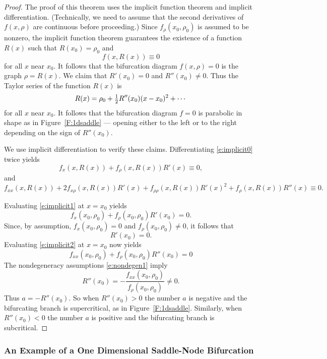 \documentclass{ximera}
\begin{document}
\begin{proof}  The proof of this theorem uses the implicit function theorem and
implicit differentiation.  (Technically, we need to assume that the second
derivatives of $f(x,\rho)$ are continuous before proceeding.) Since 
$f_\rho(x_0,\rho_0)$ is assumed to be nonzero, the implicit function theorem 
guarantees the existence of a function $R(x)$ such that $R(x_0)=\rho_0$ and
\begin{equation}  \label{e:implicit0}
f(x,R(x))\equiv 0
\end{equation}
for all $x$ near $x_0$.  It follows that the bifurcation diagram $f(x,\rho)=0$
is the graph $\rho = R(x)$.  We claim that $R'(x_0)=0$ and $R''(x_0)\neq 0$. 
Thus the Taylor series of the function $R(x)$ is
\[
R(x) = \rho_0 + \mbox{$\frac{1}{2}$} R''(x_0)(x-x_0)^2 + \cdots 
\]
for all $x$ near $x_0$.  It follows that the bifurcation diagram $f=0$ is
parabolic in shape as in Figure~\ref{F:1dsaddle} --- opening either to the 
left or to the right depending on the sign of $R''(x_0)$.

We use implicit differentiation to verify these claims. Differentiating
\eqref{e:implicit0} twice yields 
\begin{equation}  \label{e:implicit1}
f_x(x,R(x)) + f_\rho(x,R(x))R'(x) \equiv 0,
\end{equation}
and 
\begin{equation}  \label{e:implicit2}
f_{xx}(x,R(x)) + 2f_{x\rho}(x,R(x))R'(x) + f_{\rho\rho}(x,R(x))R'(x)^2 
+ f_\rho(x,R(x))R''(x) \equiv 0.
\end{equation}

Evaluating \eqref{e:implicit1} at $x=x_0$ yields
\[
f_x(x_0,\rho_0) + f_\rho(x_0,\rho_0)R'(x_0) = 0. 
\]
Since, by assumption, $f_x(x_0,\rho_0)=0$ and $f_\rho(x_0,\rho_0)\neq 0$,
it follows that 
\[
R'(x_0)=0.
\]
Evaluating \eqref{e:implicit2} at $x=x_0$ now yields
\[
f_{xx}(x_0,\rho_0) +  f_\rho(x_0,\rho_0)R''(x_0) = 0
\]
The nondegeneracy assumptions \eqref{e:nondegen1} imply
\[
R''(x_0) = -\frac{f_{xx}(x_0,\rho_0)}{f_\rho(x_0,\rho_0)} \neq 0.
\]
Thus $a=-R''(x_0)$.  So when $R''(x_0)>0$ the number $a$ is negative and the
bifurcating branch is supercritical, as in Figure~\ref{F:1dsaddle}.  Similarly, 
when $R''(x_0)<0$ the number $a$ is positive and the bifurcating branch is 
subcritical. \end{proof}
 
\subsubsection*{An Example of a One Dimensional Saddle-Node Bifurcation}
\end{document}
